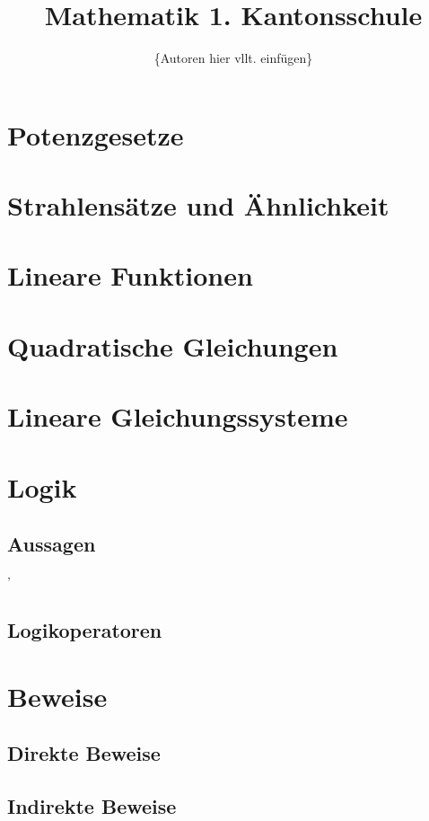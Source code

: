 \documentclass[12pt,a4paper,oneside]{scrbook}
\author{\{Autoren hier vllt. einfügen\}}
\title{Mathematik 1. Kantonsschule}
\begin{document}
\maketitle
\tableofcontents

\newpage

\chapter{Potenzgesetze}


\chapter{Strahlensätze und Ähnlichkeit}


\chapter{Lineare Funktionen}


\chapter{Quadratische Gleichungen}


\chapter{Lineare Gleichungssysteme}


\chapter{Logik}
\section{Aussagen}'
\section{Logikoperatoren}

\chapter{Beweise}
\section{Direkte Beweise}

\section{Indirekte Beweise}
\end{document}
